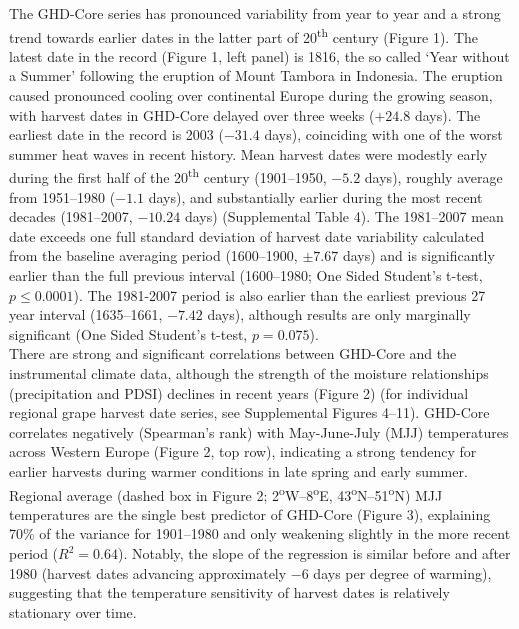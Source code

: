 \documentclass[final]{nature}
\begin{document}
\indent The GHD-Core series has pronounced variability from year to year and a strong trend towards earlier dates in the latter part of 20\textsuperscript{th} century (Figure 1). The latest date in the record (Figure 1, left panel) is 1816, the so called `Year without a Summer' following the eruption of Mount Tambora in Indonesia\cite{Oppenheimer2003}. The eruption caused pronounced cooling over continental Europe during the growing season, with harvest dates in GHD-Core delayed over three weeks ($+24.8$ days). The earliest date in the record is 2003 ($-31.4$ days), coinciding with one of the worst summer heat waves in recent history\cite{Rebetz2006}. Mean harvest dates were modestly early during the first half of the 20\textsuperscript{th} century (1901--1950, $-5.2$ days), roughly average from 1951--1980 ($-1.1$ days), and substantially earlier during the most recent decades (1981--2007, $-10.24$ days) (Supplemental Table 4). The 1981--2007 mean date exceeds one full standard deviation of harvest date variability calculated from the baseline averaging period (1600--1900, $\pm7.67$ days) and is significantly earlier than the full previous interval (1600--1980; One Sided Student's t-test, $p\le0.0001$). The 1981-2007 period is also earlier than the earliest previous 27 year interval (1635--1661, $-7.42$ days), although results are only marginally significant (One Sided Student's t-test, $p=0.075$).\\
\indent There are strong and significant correlations between GHD-Core and the instrumental climate data, although the strength of the moisture relationships (precipitation and PDSI) declines in recent years (Figure 2) (for individual regional grape harvest date series, see Supplemental Figures 4--11). GHD-Core correlates negatively (Spearman's rank) with May-June-July (MJJ) temperatures across Western Europe (Figure 2, top row), indicating a strong tendency for earlier harvests during warmer conditions in late spring and early summer. Regional average (dashed box in Figure 2; 2\textsuperscript{o}W--8\textsuperscript{o}E, 43\textsuperscript{o}N--51\textsuperscript{o}N) MJJ temperatures are the single best predictor of GHD-Core (Figure 3), explaining 70\% of the variance for 1901--1980 and only weakening slightly in the more recent period ($R^2=0.64$). Notably, the slope of the regression is similar before and after 1980 (harvest dates advancing approximately $-6$ days per degree of warming), suggesting that the temperature sensitivity of harvest dates is relatively stationary over time.\\
\end{document}
